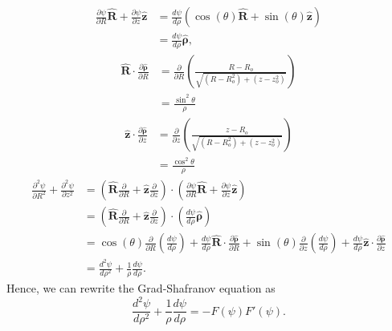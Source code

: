 \documentclass{article}
\begin{document}
\[\begin{aligned}
    \frac{\partial \psi}{\partial R}\mathbf{\hat{R}} + \frac{\partial \psi}{\partial z}\mathbf{\hat{z}} &= \frac{d \psi}{d \rho}(\cos(\theta) \mathbf{\hat{R}} + \sin(\theta)\mathbf{\hat{z}}) \\
    &= \frac{d \psi}{d \rho}\mathbf{\hat{\rho}},
\end{aligned}
\]
\[\begin{aligned}
\mathbf{\hat{R}}\cdot\frac{\partial \mathbf{\hat{\rho}}}{\partial R} &= \frac{\partial}{\partial R}\left(\frac{R-R_o}{\sqrt{(R-R_o^2)+(z-z_o^2)}}\right)\\
&= \frac{\sin^2\theta}{\rho}
\end{aligned}\]
\[\begin{aligned}
\mathbf{\hat{z}}\cdot\frac{\partial \mathbf{\hat{\rho}}}{\partial z} &= \frac{\partial}{\partial z}\left(\frac{z-R_o}{\sqrt{(R-R_o^2)+(z-z_o^2)}}\right)\\
&= \frac{\cos^2\theta}{\rho}
\end{aligned}\]
\[\begin{aligned}
\frac{\partial^2\psi}{\partial R^2} + \frac{\partial^2 \psi}{\partial z^2} &= \left(\mathbf{\hat{R}}\frac{\partial }{\partial R} + \mathbf{\hat{z}}\frac{\partial }{\partial z}\right)
\cdot\left(\frac{\partial \psi}{\partial R}\mathbf{\hat{R}} + \frac{\partial \psi}{\partial z}\mathbf{\hat{z}}\right) \\ 
&= \left(\mathbf{\hat{R}}\frac{\partial }{\partial R} + \mathbf{\hat{z}}\frac{\partial }{\partial z}\right) \cdot \left(\frac{d \psi}{d \rho}\mathbf{\hat{\rho}}\right) \\
&= \cos(\theta)\frac{\partial}{\partial R}\left(\frac{d \psi}{d \rho}\right)
+ \frac{d \psi}{d \rho}\mathbf{\hat{R}}\cdot\frac{\partial \mathbf{\hat{\rho}}}{\partial R}
+ \sin(\theta)\frac{\partial}{\partial z}\left(\frac{d \psi}{d \rho}\right)
+ \frac{d \psi}{d \rho}\mathbf{\hat{z}}\cdot\frac{\partial \mathbf{\hat{\rho}}}{\partial z} \\
&= \frac{d^2\psi}{d \rho^2} + \frac{1}{\rho}\frac{d \psi}{d \rho}.
\end{aligned}\]
Hence,
we can rewrite the Grad-Shafranov equation as
\[\frac{d^2\psi}{d \rho^2} + \frac{1}{\rho}\frac{d \psi}{d \rho} = -F(\psi)F'(\psi).\]
\end{document}
